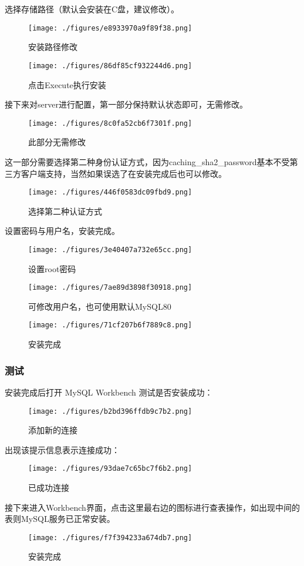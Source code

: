 选择存储路径（默认会安装在C盘，建议修改）。
\begin{figure}[ht]
\centering
\texttt{[image: ./figures/e8933970a9f89f38.png]}
\caption{安装路径修改} \label{fig_MSQ001_10}
\end{figure}

\begin{figure}[ht]
\centering
\texttt{[image: ./figures/86df85cf932244d6.png]}
\caption{点击Execute执行安装} \label{fig_MSQ001_11}
\end{figure}

接下来对server进行配置，第一部分保持默认状态即可，无需修改。
\begin{figure}[ht]
\centering
\texttt{[image: ./figures/8c0fa52cb6f7301f.png]}
\caption{此部分无需修改} \label{fig_MSQ001_12}
\end{figure}

这一部分需要选择第二种身份认证方式，因为caching_sha2_password基本不受第三方客户端支持，当然如果误选了在安装完成后也可以修改。

\begin{figure}[ht]
\centering
\texttt{[image: ./figures/446f0583dc09fbd9.png]}
\caption{选择第二种认证方式} \label{fig_MSQ001_13}
\end{figure}

设置密码与用户名，安装完成。
\begin{figure}[ht]
\centering
\texttt{[image: ./figures/3e40407a732e65cc.png]}
\caption{设置root密码} \label{fig_MSQ001_14}
\end{figure}

\begin{figure}[ht]
\centering
\texttt{[image: ./figures/7ae89d3898f30918.png]}
\caption{可修改用户名，也可使用默认MySQL80} \label{fig_MSQ001_15}
\end{figure}

\begin{figure}[ht]
\centering
\texttt{[image: ./figures/71cf207b6f7889c8.png]}
\caption{安装完成} \label{fig_MSQ001_16}
\end{figure}

\subsubsection{测试}
安装完成后打开 MySQL Workbench 测试是否安装成功：
\begin{figure}[ht]
\centering
\texttt{[image: ./figures/b2bd396ffdb9c7b2.png]}
\caption{添加新的连接} \label{fig_MSQ001_17}
\end{figure}

出现该提示信息表示连接成功：
\begin{figure}[ht]
\centering
\texttt{[image: ./figures/93dae7c65bc7f6b2.png]}
\caption{已成功连接} \label{fig_MSQ001_18}
\end{figure}

接下来进入Workbench界面，点击这里最右边的图标进行查表操作，如出现中间的表则MySQL服务已正常安装。
\begin{figure}[ht]
\centering
\texttt{[image: ./figures/f7f394233a674db7.png]}
\caption{安装完成} \label{fig_MSQ001_19}
\end{figure}